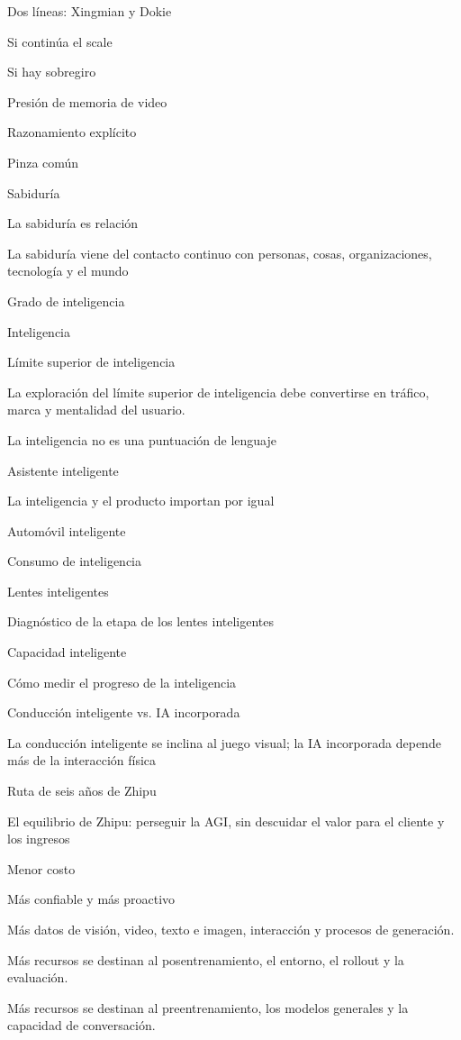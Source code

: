 \documentclass{article}
\begin{document}
Dos líneas: Xingmian y Dokie

Si continúa el scale

Si hay sobregiro

Presión de memoria de video

Razonamiento explícito

Pinza común

Sabiduría

La sabiduría es relación

La sabiduría viene del contacto continuo con personas, cosas, organizaciones, tecnología y el mundo

Grado de inteligencia

Inteligencia

Límite superior de inteligencia

La exploración del límite superior de inteligencia debe convertirse en tráfico, marca y mentalidad del usuario.

La inteligencia no es una puntuación de lenguaje

Asistente inteligente

La inteligencia y el producto importan por igual

Automóvil inteligente

Consumo de inteligencia

Lentes inteligentes

Diagnóstico de la etapa de los lentes inteligentes

Capacidad inteligente

Cómo medir el progreso de la inteligencia

Conducción inteligente vs. IA incorporada

La conducción inteligente se inclina al juego visual; la IA incorporada depende más de la interacción física

Ruta de seis años de Zhipu

El equilibrio de Zhipu: perseguir la AGI, sin descuidar el valor para el cliente y los ingresos

Menor costo

Más confiable y más proactivo

Más datos de visión, video, texto e imagen, interacción y procesos de generación.

Más recursos se destinan al posentrenamiento, el entorno, el rollout y la evaluación.

Más recursos se destinan al preentrenamiento, los modelos generales y la capacidad de conversación.
\end{document}

